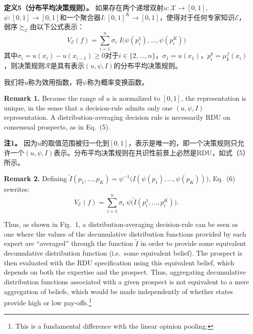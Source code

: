 \documentclass[12pt,a4paper]{article}
\newenvironment{original}
  {\par\noindent\ignorespaces}
  {\par}
\newenvironment{translation}
  {\par\noindent{\color{transblue}\ignorespaces}}
  {\par\medskip}
\begin{document}
\begin{translation}
\textbf{定义5（分布平均决策规则）。} 如果存在两个递增双射$u: \mathcal{X} \to [0,1]$, $\psi: [0,1] \to [0,1]$和一个聚合器$I: [0,1]^{K} \to [0,1]$，使得对于任何专家知识$\mathcal{E}$，弱序$\succsim_{\mathcal{E}}$由以下公式表示：
\[
V_{\mathcal{E}}(f) = \sum_{i=1}^{n} \sigma_{i} \; I\!\big(\psi(p^{1}_{i}), \dots, \psi(p^{K}_{i})\big) \tag{6}
\]
其中$\sigma_{i} = u(x_{i}) - u(x_{i-1}) \geq 0$对于$i \in \{2, \dots, n\}$，$\sigma_{1} = u(x_{1})$，$p^{k}_{i} = \mu_{k}^{f}(x_{i})$，则决策规则$\mathcal{R}$是具有表示$(u, \psi, I)$的分布平均决策规则。

我们将$u$称为效用指数，将$\psi$称为概率变换函数。
\end{translation}

\begin{original}
\textbf{Remark 1.} Because the range of $u$ is normalized to $[0,1]$, the representation is unique, in the sense that a decision-rule admits only one $(u, \psi, I)$ representation. A distribution-averaging decision rule is necessarily RDU on consensual prospects, as in Eq.\ (5).
\end{original}

\begin{translation}
\textbf{注1。} 因为$u$的取值范围被归一化到$[0,1]$，表示是唯一的，即一个决策规则只允许一个$(u, \psi, I)$表示。分布平均决策规则在共识性前景上必然是RDU，如式（5）所示。
\end{translation}

\begin{original}
\textbf{Remark 2.} Defining $\tilde{I}(p_{1}, \dots, p_{K}) = \psi^{-1}\!\big(I(\psi(p_{1}), \dots, \psi(p_{K}))\big)$, Eq.\ (6) rewrites:
\[
V_{\mathcal{E}}(f) = \sum_{i=1}^{n} \sigma_{i} \; \psi\!\big(\tilde{I}(p^{1}_{i}, \dots, p^{K}_{i})\big). \tag{7}
\]

Thus, as shown in Fig.\ 1, a distribution-averaging decision-rule can be seen as one where the values of the decumulative distribution functions provided by each expert are ``averaged'' through the function $\tilde{I}$ in order to provide some equivalent decumulative distribution function (i.e.\ some equivalent belief). The prospect is then evaluated with the RDU specification using this equivalent belief, which depends on both the expertise and the prospect. Thus, aggregating decumulative distribution functions associated with a given prospect is not equivalent to a mere aggregation of beliefs, which would be made independently of whether states provide high or low pay-offs.\footnote{This is a fundamental difference with the linear opinion pooling.}
\end{original}
\end{document}
